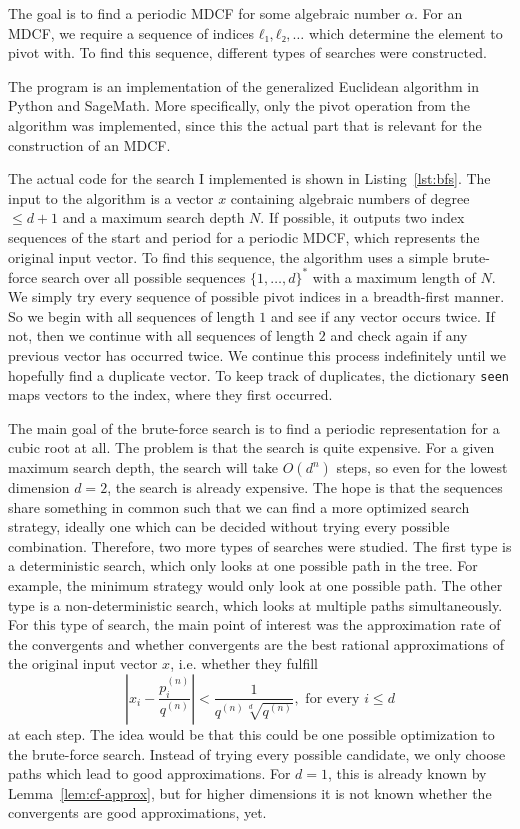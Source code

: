 The goal is to find a periodic MDCF for some algebraic number $α$.
For an MDCF, we require a sequence of indices $ℓ₁, ℓ₂, …$ which determine the
element to pivot with.
To find this sequence, different types of searches were constructed.

The program is an implementation of the generalized Euclidean algorithm
in Python and SageMath.
More specifically, only the pivot operation from the algorithm was implemented,
since this the actual part that is relevant for the construction of an MDCF.

The actual code for the search I implemented is shown in Listing~\ref{lst:bfs}.
The input to the algorithm is a vector $x$ containing algebraic numbers of
degree $≤ d+1$ and a maximum search depth $N$.
If possible, it outputs two index sequences of the start and period for a periodic MDCF,
which represents the original input vector.
To find this sequence, the algorithm uses a simple brute-force search over all
possible sequences $\{1,\dots,d\}^*$ with a maximum length of $N$.
We simply try every sequence of possible pivot indices in a breadth-first manner.
So we begin with all sequences of length $1$ and see if any vector occurs twice.
If not, then we continue with all sequences of length $2$ and check again if
any previous vector has occurred twice.
We continue this process indefinitely until we hopefully find a duplicate vector.
To keep track of duplicates, the dictionary \verb|seen| maps vectors to the index,
where they first occurred.

The main goal of the brute-force search is to find a periodic representation for a cubic root at all.
The problem is that the search is quite expensive.
For a given maximum search depth, the search will take $O(d^n)$ steps,
so even for the lowest dimension $d = 2$, the search is already expensive.
The hope is that the sequences share something in common such that we can find
a more optimized search strategy, ideally one which can be decided without
trying every possible combination.
Therefore, two more types of searches were studied.
The first type is a deterministic search,
which only looks at one possible path in the tree.
For example, the minimum strategy would only look at one possible path.
The other type is a non-deterministic search,
which looks at multiple paths simultaneously.
For this type of search, the main point of interest was the approximation rate of the convergents
and whether convergents are the best rational approximations of the original input vector $x$,
i.e. whether they fulfill
\[
  \left|x_i - \frac{p_i^{(n)}}{q^{(n)}}\right| < \frac{1}{q^{(n)} \sqrt[d]{q^{(n)}}}, \text{ for every } i ≤ d
\]
at each step.
The idea would be that this could be one possible optimization to the brute-force search.
Instead of trying every possible candidate, we only choose paths which lead to good approximations.
For $d = 1$, this is already known by Lemma~\ref{lem:cf-approx},
but for higher dimensions it is not known whether the convergents are good
approximations, yet.

